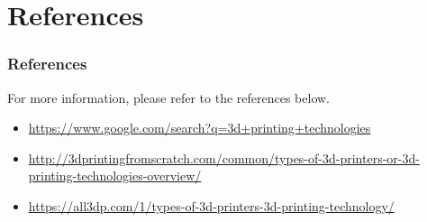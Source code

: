 \documentclass[english,10pt]{beamer}
\begin{document}
\section{References}
\begin{frame}
  \frametitle{References}
  For more information, please refer to the references below.
  \begin{itemize}
    \item \url{https://www.google.com/search?q=3d+printing+technologies}
    \item \url{http://3dprintingfromscratch.com/common/types-of-3d-printers-or-3d-printing-technologies-overview/}
    \item \url{https://all3dp.com/1/types-of-3d-printers-3d-printing-technology/}
  \end{itemize}
\end{frame}
\end{document}
